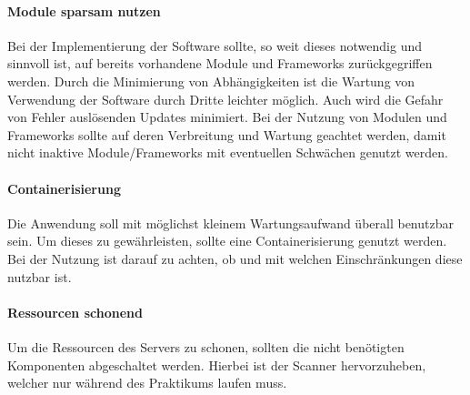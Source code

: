 \paragraph{Module sparsam nutzen}
Bei der Implementierung der Software sollte, so weit dieses notwendig und sinnvoll ist, auf bereits vorhandene Module und Frameworks zurückgegriffen werden. Durch die Minimierung von Abhängigkeiten ist die Wartung von Verwendung der Software durch Dritte leichter möglich. Auch wird die Gefahr von Fehler auslösenden Updates minimiert. Bei der Nutzung von Modulen und Frameworks sollte auf deren Verbreitung und Wartung geachtet werden, damit nicht inaktive Module/Frameworks mit eventuellen Schwächen genutzt werden.

\paragraph{Containerisierung}
Die Anwendung soll mit möglichst kleinem Wartungsaufwand überall benutzbar sein. Um dieses zu gewährleisten, sollte eine Containerisierung genutzt werden. Bei der Nutzung ist darauf zu achten, ob und mit welchen Einschränkungen diese nutzbar ist.

\paragraph{Ressourcen schonend}
Um die Ressourcen des Servers zu schonen, sollten die nicht benötigten Komponenten abgeschaltet werden. Hierbei ist der Scanner hervorzuheben, welcher nur während des Praktikums laufen muss. 